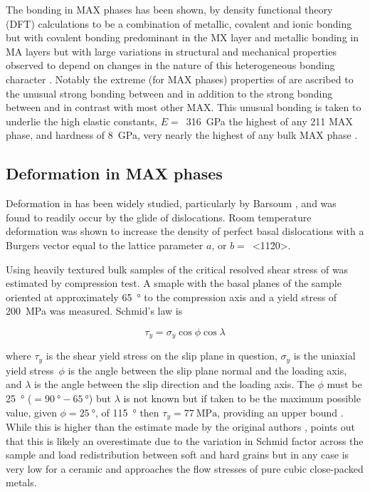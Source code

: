 The bonding in MAX phases has been shown, by density functional theory (DFT) calculations to be a combination of metallic, covalent and ionic bonding but with covalent bonding predominant in the MX layer and metallic bonding in MA layers but with large variations in structural and mechanical properties observed to depend on changes in the nature of this heterogeneous bonding character \cite{Radovic2013,Sun2011}. Notably the extreme (for MAX phases) properties of  are ascribed to the unusual strong bonding between  and  in addition to the strong bonding between  and  in contrast with most other MAX. This unusual bonding is taken to underlie the high elastic constants, $E =$~\SI{316}{\giga\pascal} the highest of any 211 MAX phase, and hardness of \SI{8}{\giga\pascal}, very nearly the highest of any bulk MAX phase \cite{Feng2010, Sun2011}.

\subsection{Deformation in MAX phases}

Deformation in  has been widely studied, particularly by Barsoum \cite{Farber1998,Barsoum1999,Farber1999,Barsoum1999dislocs_kinkbands,Barsoum2001}, and was found to readily occur by the glide of dislocations. Room temperature deformation was shown to increase the density of perfect basal dislocations with a Burgers vector equal to the lattice parameter $a$, or $b =$~<11\={2}0>. 

Using heavily textured bulk samples of  the critical resolved shear stress of  was estimated by compression test. A smaple with the basal planes of the sample oriented at approximately \SI{65}{\degree} to the compression axis and a yield stress of \SI{200}{\mega\pascal} was measured. Schmid's law is 

\begin{equation}
\tau_y = \sigma_y \cos{\phi} \cos{\lambda}
\end{equation}

where $\tau_y$ is the shear yield stress on the slip plane in question, $\sigma_y$ is the uniaxial yield stress\ $\phi$ is the angle between the slip plane normal and the loading axis, and $\lambda$ is the angle between the slip direction and the loading axis. The $\phi$ must be \SI{25}{\degree} ($=\SI{90}{\degree} - \SI{65}{\degree}$) but $\lambda$ is not known but if taken to be the maximum possible value, given $\phi=\SI{25}{\degree}$, of \SI{115}{\degree} then $\tau_y = \SI{77}{\mega\pascal}$, providing an upper bound \cite{Humphrey2012}. While this is higher than the estimate made by the original authors \cite{Barsoum1999}, \citet{Humphrey2012} points out that this is likely an overestimate due to the variation in Schmid factor across the sample and load redistribution between soft and hard grains but in any case is very low for a ceramic and approaches the flow stresses of pure cubic close-packed metals.


